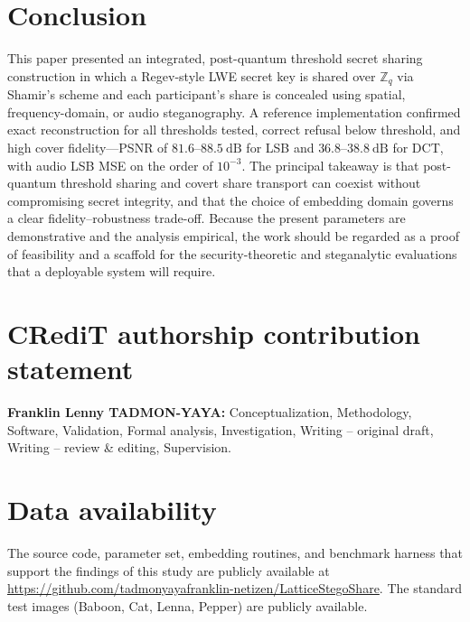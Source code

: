 \documentclass[runningheads]{llncs}
\begin{document}
\section{Conclusion}
\label{sec:conclusion}

This paper presented an integrated, post-quantum threshold secret sharing
construction in which a Regev-style LWE secret key is shared over
$\mathbb{Z}_q$ via Shamir's scheme and each participant's share is concealed
using spatial, frequency-domain, or audio steganography. A reference
implementation confirmed exact reconstruction for all thresholds tested,
correct refusal below threshold, and high cover fidelity---PSNR of
$81.6$--$88.5~\mathrm{dB}$ for LSB and $36.8$--$38.8~\mathrm{dB}$ for DCT, with
audio LSB MSE on the order of $10^{-3}$. The principal takeaway is that
post-quantum threshold sharing and covert share transport can coexist without
compromising secret integrity, and that the choice of embedding domain governs
a clear fidelity--robustness trade-off. Because the present parameters are
demonstrative and the analysis empirical, the work should be regarded as a
proof of feasibility and a scaffold for the security-theoretic and steganalytic
evaluations that a deployable system will require.

\section*{CRediT authorship contribution statement}
\textbf{Franklin Lenny TADMON-YAYA:} Conceptualization, Methodology, Software,
Validation, Formal analysis, Investigation, Writing -- original draft, Writing
-- review \& editing, Supervision.

\section*{Data availability}
The source code, parameter set, embedding routines, and benchmark harness that
support the findings of this study are publicly available at
\url{https://github.com/tadmonyayafranklin-netizen/LatticeStegoShare}. The
standard test images (Baboon, Cat, Lenna, Pepper) are publicly available.
\end{document}
